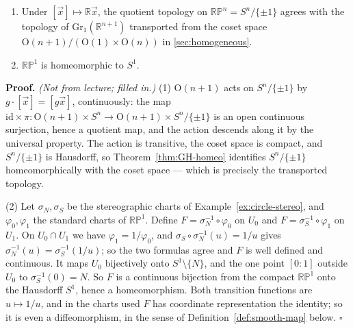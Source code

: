 \documentclass[11pt]{report}
\makeatletter
\newcounter{thmcounter}[section]
\renewenvironment{proof}[1][Proof]{\noindent\textbf{#1.} }{\hfill$\square$\par\vspace{5pt}}
\newcommand{\thmlabel}[1]{\edef\@currentlabel{\arabic{section}.\arabic{thmcounter}}\label{#1}}
\newcommand{\Ogp}{\mathrm{O}}
\newcommand{\Gr}{\mathrm{Gr}}
\newcommand{\leeref}[1]{\par\smallskip{\raggedleft\footnotesize\textsc{Lee}:\ #1\par}}
\makeatother
\begin{document}
\begin{propbox}\thmlabel{prop:rpn-topologies}
\begin{enumerate}
    \item Under $[\vec x] \mapsto \mathbb{R}\vec x$, the quotient topology on $\mathbb{RP}^n = S^n/\{\pm1\}$ agrees with the topology of $\Gr_1(\mathbb{R}^{n+1})$ transported from the coset space $\Ogp(n+1)/(\Ogp(1)\times\Ogp(n))$ in \ref{sec:homogeneous}.
    \item $\mathbb{RP}^1$ is homeomorphic to $S^1$.
\end{enumerate}
\leeref{Examples 1.5 and 1.33}
\end{propbox}

\begin{proof}
\textit{(Not from lecture; filled in.)} (1) $\Ogp(n+1)$ acts on $S^n/\{\pm1\}$ by $g \cdot [\vec x] = [g\vec x]$, continuously: the map $\mathrm{id} \times \pi : \Ogp(n+1) \times S^n \to \Ogp(n+1) \times S^n/\{\pm1\}$ is an open continuous surjection, hence a quotient map, and the action descends along it by the universal property. The action is transitive, the coset space is compact, and $S^n/\{\pm1\}$ is Hausdorff, so Theorem~\ref{thm:GH-homeo} identifies $S^n/\{\pm1\}$ homeomorphically with the coset space --- which is precisely the transported topology.

(2) Let $\sigma_N, \sigma_S$ be the stereographic charts of Example~\ref{ex:circle-stereo}, and $\varphi_0, \varphi_1$ the standard charts of $\mathbb{RP}^1$. Define $F = \sigma_N^{-1} \circ \varphi_0$ on $U_0$ and $F = \sigma_S^{-1} \circ \varphi_1$ on $U_1$. On $U_0 \cap U_1$ we have $\varphi_1 = 1/\varphi_0$, and $\sigma_S \circ \sigma_N^{-1}(u) = 1/u$ gives $\sigma_N^{-1}(u) = \sigma_S^{-1}(1/u)$; so the two formulas agree and $F$ is well defined and continuous. It maps $U_0$ bijectively onto $S^1 \setminus \{N\}$, and the one point $[0:1]$ outside $U_0$ to $\sigma_S^{-1}(0) = N$. So $F$ is a continuous bijection from the compact $\mathbb{RP}^1$ onto the Hausdorff $S^1$, hence a homeomorphism. Both transition functions are $u \mapsto 1/u$, and in the charts used $F$ has coordinate representation the identity; so it is even a diffeomorphism, in the sense of Definition~\ref{def:smooth-map} below.
\end{proof}
\end{document}
